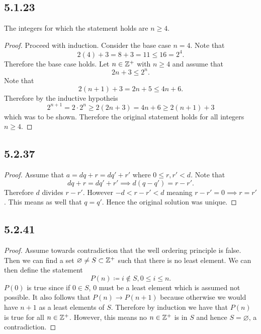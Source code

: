 \documentclass[12pt,titlepage]{extarticle}
\begin{document}
\subsection*{5.1.23}
The integers for which the statement holds are $n \geq 4$.
\begin{proof}
    Proceed with induction. Consider the base case $n = 4$. Note that
    \[
        2(4) + 3 = 8 + 3 = 11 \leq 16 = 2^4
    .\]
    Therefore the base case holds. Let $n \in \mathbb{Z}^+$ with $n \geq 4$ and assume that
    \[
        2n + 3 \leq 2^n
    .\]
    Note that
    \[
        2(n+1) + 3 = 2n + 5 \leq 4n + 6
    .\]
    Therefore by the inductive hypotheis
    \[
        2^{n+1} = 2 \cdot 2^n \geq 2(2n + 3) = 4n + 6 \geq 2(n+1) + 3
    \]
    which was to be shown. Therefore the original statement holds for all integers $n \geq 4$.
\end{proof}

\subsection*{5.2.37}
\begin{proof}
    Assume that $a = dq + r = dq' + r'$ where $0 \leq r, r' < d$. Note that
    \[
        dq + r = dq' + r' \implies d(q-q') = r - r'
    .\]
    Therefore $d$ divides $r - r'$. However $-d < r - r' < d$ meaning $r - r' = 0 \implies r = r'$. This means as well that $q = q'$. Hence the original solution was unique.
\end{proof}

\subsection*{5.2.41}
\begin{proof}
    Assume towards contradiction that the well ordering principle is false. Then we can find a set $\varnothing \neq S \subset \mathbb{Z}^+$ such that there is no least element. We can then define the statement
    \[
        P(n) \coloneq i \notin S, 0 \leq i \leq n
    .\]
$P(0)$ is true since if $0 \in S$, $0$ must be a least element which is assumed not possible. It also follows that $P(n) \to P(n+1)$ because otherwise we would have $n+1$ as a least elements of $S$. Therefore by induction we have that $P(n)$ is true for all $n \in \mathbb{Z}^+$. However, this means no $n \in \mathbb{Z}^+$ is in $S$ and hence $S = \varnothing$, a contradiction.
\end{proof}
\end{document}
